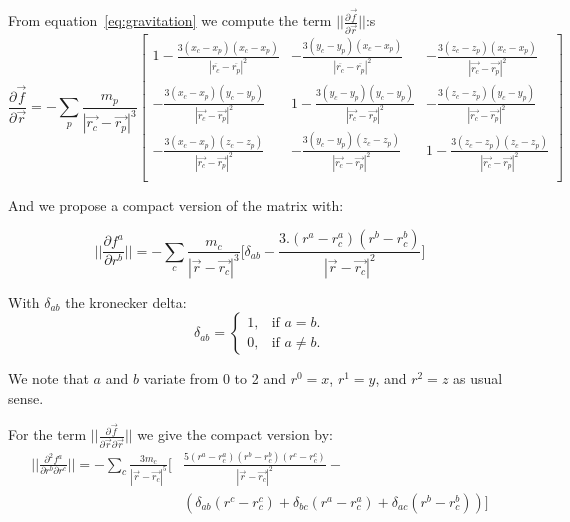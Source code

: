  From equation~\ref{eq:gravitation} we compute the term $||\frac{\partial\vec{f}}{\partial\vec{r}}||$:s
 \begin{equation}
\frac{\partial\vec{f}}{\partial\vec{r}} =
- \sum_p \frac{m_p}{|\vec{r_c}-\vec{r_p}|^3}
\begin{bmatrix}
1 - \frac{3(x_c-x_p)(x_c-x_p)}{|\overline{r_c}-\overline{r_p}|^2} & -\frac{3(y_c-y_p)(x_c-x_p)}{|\overline{r_c}-\overline{r_p}|^2}  & -\frac{3(z_c-z_p)(x_c-x_p)}{|\vec{r_c}-\vec{r_p}|^2}  \\
-\frac{3(x_c-x_p)(y_c-y_p)}{|\vec{r_c}-\vec{r_p}|^2}  & 1 - \frac{3(y_c-y_p)(y_c-y_p)}{|\vec{r_c}-\vec{r_p}|^2} &  -\frac{3(z_c-z_p)(y_c-y_p)}{|\vec{r_c}-\vec{r_p}|^2}\\
- \frac{3(x_c-x_p)(z_c-z_p)}{|\vec{r_c}-\vec{r_p}|^2}   &  -\frac{3(y_c-y_p)(z_c-z_p)}{|\vec{r_c}-\vec{r_p}|^2} &  1- \frac{3(z_c-z_p)(z_c-z_p)}{|\vec{r_c}-\vec{r_p}|^2} \\
\end{bmatrix}
 \end{equation}

And we propose a compact version of the matrix with: 
 
\begin{equation}
 ||\frac{\partial f^a}{\partial r^b}|| = -\sum_c \frac{m_c}{|\vec{r}-\vec{r_c}|^3} \Big[ \delta_{ab} - \frac{3.(r^a-r_c^a)(r^b-r_c^b)}{|\vec{r}-\vec{r_c}|^2} \Big] 
\end{equation}

With $\delta_{ab}$ the kronecker delta:
\begin{equation}
\delta_{ab} = 
\begin{cases}
    1, & \text{if $a = b$}.\\
    0, & \text{if $a\neq b$}.
  \end{cases}
\end{equation}

We note that $a$ and $b$ variate from 0 to 2 and $r^0=x$, $r^1=y$, and $r^2=z$ as usual sense. 

For the term $||\frac{\partial\vec{f}}{\partial\vec{r} \partial\vec{r}}||$ we give the compact version by:
\begin{equation}
\begin{aligned}
||\frac{\partial^2 f^a}{\partial r^b \partial r^c}|| = - \sum_c \frac{3 m_c}{|\vec{r}-\vec{r_c}|^5} \Big[ & \frac{5(r^a-r_c^a)(r^b-r_c^b)(r^c-r_c^c)}{|\vec{r}-\vec{r_c}|^2} - \\ 
		 & \left( \delta_{ab} (r^c-r_c^c)+\delta_{bc} (r^a-r_c^a)+\delta_{ac} (r^b-r_c^b) \right) \Big] 
\end{aligned}
\end{equation} 

